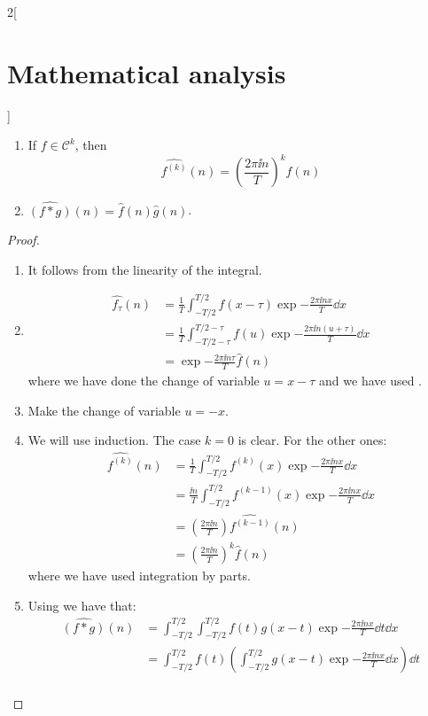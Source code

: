 \documentclass[../../../main_math.tex]{subfiles}
\begin{document}
\begin{multicols}{2}[\section{Mathematical analysis}]
\begin{proposition}
\begin{enumerate}
      \item If $f\in \mathcal{C}^k$, then $$\widehat{f^{(k)}}(n)=\left(\frac{2\pi\ii n}{T}\right)^k\widehat{f}(n)$$
      \item $\widehat{(f*g)}(n)=\widehat{f}(n)\widehat{g}(n)$.
    \end{enumerate}
  \end{proposition}
  \begin{proof}
    \begin{enumerate}
      \item It follows from the linearity of the integral.
      \item \begin{align*}
              \widehat{f_\tau}(n) & =\frac{1}{T}\int_{-T/2}^{T/2}f(x-\tau)\exp{-\frac{2\pi\ii nx}{T}}\dd{x}             \\
                                  & =\frac{1}{T}\int_{-T/2-\tau}^{T/2-\tau}f(u)\exp{-\frac{2\pi\ii n(u+\tau)}{T}}\dd{x} \\
                                  & =\exp{-\frac{2\pi\ii n\tau}{T}}\widehat{f}(n)
            \end{align*}
            where we have done the change of variable $u=x-\tau$ and we have used .
      \item Make the change of variable $u=-x$.
      \item We will use induction. The case $k=0$ is clear. For the other ones:
            \begin{align*}
              \widehat{f^{(k)}}(n) & =\frac{1}{T}\int_{-T/2}^{T/2} f^{(k)}(x)\exp{-\frac{2\pi\ii nx}{T}}\dd{x}       \\
                                   & =\frac{\ii n}{T}\int_{-T/2}^{T/2} f^{(k-1)}(x)\exp{-\frac{2\pi\ii nx}{T}}\dd{x} \\
                                   & =\left(\frac{2\pi\ii n}{T}\right)\widehat{f^{(k-1)}}(n)                         \\
                                   & ={\left(\frac{2\pi\ii n}{T}\right)}^k\widehat{f}(n)
            \end{align*}
            where we have used integration by parts.
      \item Using  we have that:
            \begin{align*}
              \widehat{(f*g)}(n) & =\int_{-T/2}^{T/2}\int_{-T/2}^{T/2} f(t)g(x-t)\exp{-\frac{2\pi\ii n x}{T}}\dd{t}\dd{x}              \\
                                 & =\int_{-T/2}^{T/2}f(t)\left(\int_{-T/2}^{T/2} g(x-t)\exp{-\frac{2\pi\ii n x}{T}}\dd{x}\right)\dd{t} \\

\end{align*}
\end{enumerate}
\end{proof}
\end{multicols}
\end{document}
